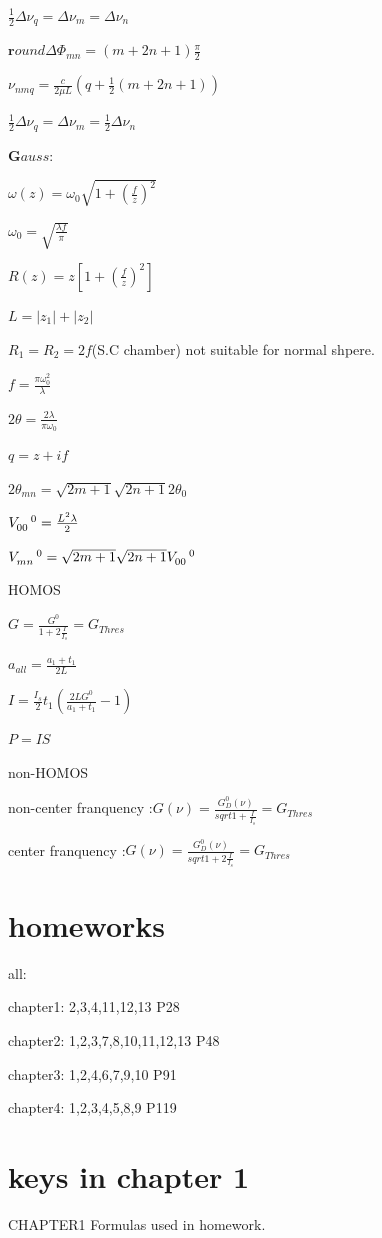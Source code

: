 \documentclass{article}
\begin{document}
$\frac12\Delta\nu_q=\Delta\nu_m=\Delta \nu_n$

$\bm round\Delta\Phi_{mn}=(m+2n+1)\frac{\pi}2$

$\nu_{nmq}=\frac c{2\mu L}(q+\frac12(m+2n+1))$

$\frac12\Delta\nu_q=\Delta\nu_m=\frac12\Delta \nu_n$

$\bm Gauss$:

$\omega(z)=\omega_0\sqrt{1+({\frac fz})^2}$

$\omega_0=\sqrt{\frac{\lambda f}{\pi}}$

$R(z)=z[1+(\frac fz)^2]$

$L=|z_1|+|z_2|$

$R_1=R_2=2f$(S.C chamber) not suitable for normal shpere.

$f=\frac{\pi\omega_0^2}{\lambda}$

$2\theta=\frac{2\lambda}{\pi\omega_0}$

$q=z+if$

$2\theta_{mn}=\sqrt{2m+1}\sqrt{2n+1}2\theta_0$

$ \tensor V{_{00}^0}=\frac{L^2\lambda}2$

$ \tensor V{_{mn}^0}=\sqrt{2m+1}\sqrt{2n+1} \tensor V{_{00}^0}$

HOMOS

$G=\frac{G^0}{1+2\frac{I}{I_s}}=G_{Thres}$

$a_{all}=\frac{a_1+t_1}{2L}$

$I=\frac{I_s}2t_1(\frac{2LG^0}{a_1+t_1}-1)$

$P=IS$

non-HOMOS

non-center franquency :$G(\nu)=\frac{G_D^0(\nu)}{sqrt{1+\frac{I}{I_s}}}=G_{Thres}$

center franquency :$G(\nu)=\frac{G_D^0(\nu)}{sqrt{1+2\frac{I}{I_s}}}=G_{Thres}$

\newpage
\section{homeworks}
all:

chapter1: 2,3,4,11,12,13 P28

chapter2: 1,2,3,7,8,10,11,12,13  P48

chapter3: 1,2,4,6,7,9,10  P91

chapter4: 1,2,3,4,5,8,9  P119
\newpage
\section{keys in chapter 1}
CHAPTER1 Formulas used in homework.
\end{document}
